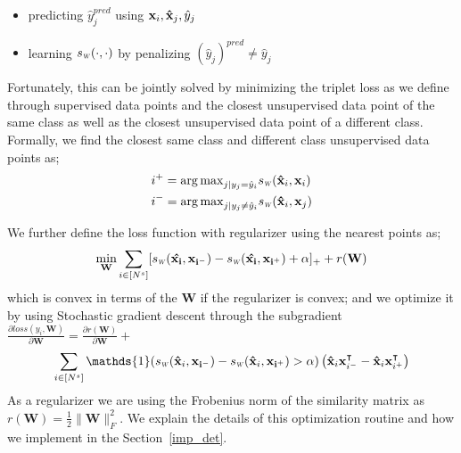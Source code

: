 \begin{itemize}
\item predicting $\hat{y}^{pred}_j$ using $\mathbf{x}_i, \mathbf{\hat{x}}_j, \hat{y}_j$
\item learning $\sw(\cdot,\cdot)$ by penalizing  $(\hat{y}_j)^{pred} \neq \hat{y}_j$ 
\end{itemize}

Fortunately, this can be jointly solved by minimizing the triplet loss as we define through supervised data points and the closest unsupervised data point of the same class as well as the closest unsupervised data point of a different class. Formally, we find the closest same class and different class unsupervised data points as;
\begin{equation}
\begin{aligned}
&i^{+} = {\arg\max}_{j | y_j = \hat{y}_i} \sw(\xsi, \xui) \\
&i^{-} = {\arg\max}_{j | y_j \neq \hat{y}_i} \sw(\xsi,\xuj) 
\label{sup_nn}
\end{aligned}
\end{equation}

We further define the loss function with regularizer using the nearest points as;
\begin{equation}
\min_{\mathbf{W}} \sum_{i \in [N^s]} [\sw(\mathbf{\hat{x_i}},\mathbf{x_{i^-}}) - \sw(\mathbf{\hat{x_i}},\mathbf{x_{i^+}}) + \alpha]_{+} + r(\mathbf{W})
\end{equation}
which is convex in terms of the $\mathbf{W}$ if the regularizer is convex; and we optimize it by using Stochastic gradient descent through the subgradient \
\mbox{$\frac{\partial loss (y_i, \mathbf{W})}{\partial \mathbf{W}} = \frac{\partial r ( \mathbf{W})}{\partial \mathbf{W}} + $}
\begin{equation}
\sum_{i \in [N^s]} \mathds{1}(\sw(\xsi,\mathbf{x_{i^-}}) - \sw(\xsi,\mathbf{x_{i^+}})>\alpha) \left( \xsi\mathbf{x}^\intercal_{i^-} - \xsi \mathbf{x}^\intercal_{i^+}  \right)  
\label{gradw}
\end{equation}
As a regularizer we are using the Frobenius norm of the similarity matrix as $r(\mathbf{W})=\frac{1}{2}\|\mathbf{W}\|_F^2$. We explain the details of this optimization routine and how we implement in the Section~\ref{imp_det}.
